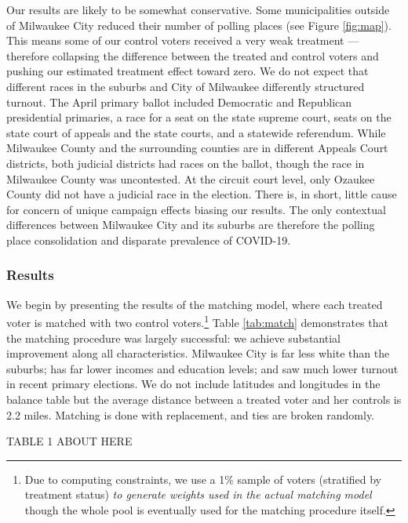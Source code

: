 \documentclass[
  12pt,
]{article}
\begin{document}
Our results are likely to be somewhat conservative. Some municipalities outside of Milwaukee City reduced their number of polling places (see Figure \ref{fig:map}). This means some of our control voters received a very weak treatment --- therefore collapsing the difference between the treated and control voters and pushing our estimated treatment effect toward zero. We do not expect that different races in the suburbs and City of Milwaukee differently structured turnout. The April primary ballot included Democratic and Republican presidential primaries, a race for a seat on the state supreme court, seats on the state court of appeals and the state courts, and a statewide referendum. While Milwaukee County and the surrounding counties are in different Appeals Court districts, both judicial districts had races on the ballot, though the race in Milwaukee County was uncontested. At the circuit court level, only Ozaukee County did not have a judicial race in the election. There is, in short, little cause for concern of unique campaign effects biasing our results. The only contextual differences between Milwaukee City and its suburbs are therefore the polling place consolidation and disparate prevalence of COVID-19.

\hypertarget{results}{%
\subsubsection*{Results}\label{results}}

We begin by presenting the results of the matching model, where each treated voter is matched with two control voters.\footnote{Due to computing constraints, we use a 1\% sample of voters (stratified by treatment status) \emph{to generate weights used in the actual matching model} though the whole pool is eventually used for the matching procedure itself.} Table \ref{tab:match} demonstrates that the matching procedure was largely successful: we achieve substantial improvement along all characteristics. Milwaukee City is far less white than the suburbs; has far lower incomes and education levels; and saw much lower turnout in recent primary elections. We do not include latitudes and longitudes in the balance table but the average distance between a treated voter and her controls is 2.2 miles. Matching is done with replacement, and ties are broken randomly.

TABLE 1 ABOUT HERE
\end{document}
